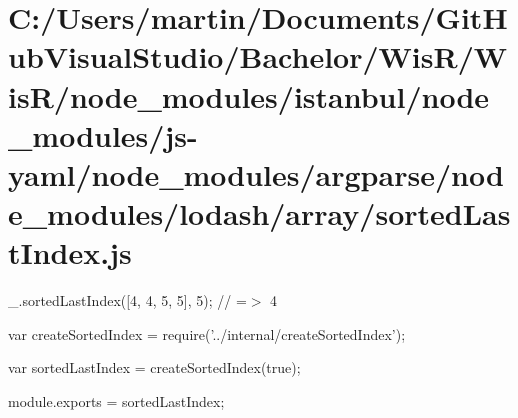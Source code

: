 \hypertarget{_c_1_2_users_2martin_2_documents_2_git_hub_visual_studio_2_bachelor_2_wis_r_2_wis_r_2node_module7bf129ee8c89851ae61797de90be4120}{}\section{C\+:/\+Users/martin/\+Documents/\+Git\+Hub\+Visual\+Studio/\+Bachelor/\+Wis\+R/\+Wis\+R/node\+\_\+modules/istanbul/node\+\_\+modules/js-\/yaml/node\+\_\+modules/argparse/node\+\_\+modules/lodash/array/sorted\+Last\+Index.\+js}
\+\_\+.\+sorted\+Last\+Index(\mbox{[}4, 4, 5, 5\mbox{]}, 5); // =$>$ 4


\begin{DoxyCodeInclude}
var createSortedIndex = require(\textcolor{stringliteral}{'../internal/createSortedIndex'});

var sortedLastIndex = createSortedIndex(\textcolor{keyword}{true});

module.exports = sortedLastIndex;
\end{DoxyCodeInclude}
 